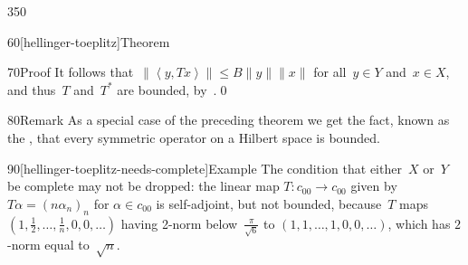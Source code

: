 \begin{parsec}{350}
\begin{point}{60}[hellinger-toeplitz]{Theorem}
\begin{point}{70}{Proof}
It follows that~$\|\left<y,Tx\right>\|\leq B\|y\|\|x\|$
for all~$y\in Y$ and~$x\in X$,
and thus~$T$ and~$T^*$ are bounded, by~.\qed
\end{point}
\begin{point}{80}{Remark}%
As a special case of the preceding theorem
we get the fact,
known as the ,%
that every symmetric
operator on a Hilbert space is bounded.
\end{point}
\begin{point}{90}[hellinger-toeplitz-needs-complete]{Example}%
The condition that either~$X$ or~$Y$ be complete may not be dropped:
the linear map $T\colon c_{00}\to c_{00}$
given by $T\alpha = (n\alpha_n)_n$ for $\alpha\in c_{00}$
is self-adjoint,
but not bounded,
because~$T$ maps $(1,\frac{1}{2},\dotsc,\frac{1}{n},0,0,\dotsc)$
having 2-norm below~$\frac{\pi}{\sqrt{6}}$
to $(1,1,\dotsc,1,0,0,\dotsc)$,
which has $2$-norm equal to~$\sqrt{n}$.
\end{point}
\end{point}
\end{parsec}
